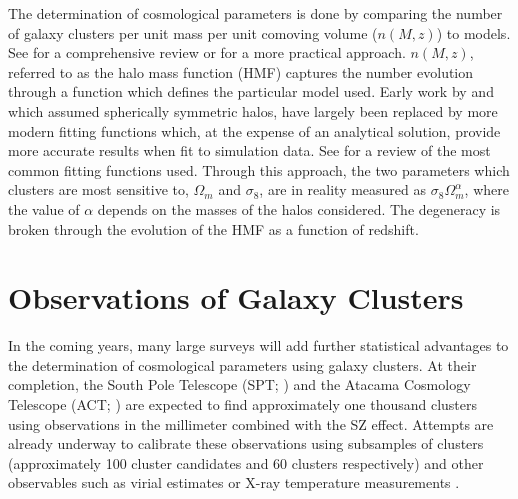 The determination of cosmological parameters is done by comparing the number of galaxy clusters per unit mass per unit comoving volume ($n(M,z)$) to models. See \cite{Allen2011} for a comprehensive review or \cite{Murray2013} for a more practical approach. $n(M,z)$, referred to as the halo mass function (HMF) captures the number evolution through a function which defines the particular model used. Early work by \cite{Press1974} and \cite{Bond1991} which assumed spherically symmetric halos, have largely been replaced by more modern fitting functions which, at the expense of an analytical solution, provide more accurate results when fit to simulation data. See \cite{Murray2013} for a review of the most common fitting functions used. Through this approach, the two parameters which clusters are most sensitive to, $\Omega_m$ and $\sigma_8$, are in reality measured as $\sigma_8\Omega_m^\alpha$, where the value of $\alpha$ depends on the masses of the halos considered. The degeneracy is broken through the evolution of the HMF as a function of redshift. 


\section{Observations of Galaxy Clusters}
In the coming years, many large surveys will add further statistical advantages to the determination of cosmological parameters using galaxy clusters. At their completion, the South Pole Telescope (SPT; \citealt{Carlstrom2011}) and the Atacama Cosmology Telescope (ACT; \citealt{Swetz2011}) are expected to find approximately one thousand clusters using observations in the millimeter combined with the SZ effect. Attempts are already underway to calibrate these observations using subsamples of clusters (approximately 100 cluster candidates and 60 clusters respectively) and other observables such as virial estimates or X-ray temperature measurements . 

